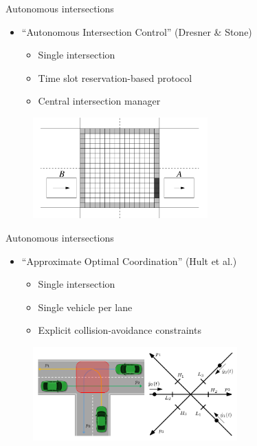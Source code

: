 \documentclass[bigger]{beamer}
\begin{document}
\begin{frame}[label={sec:orgdab9fd7}]{Autonomous intersections}
\begin{itemize}
\item ``Autonomous Intersection Control'' (Dresner \& Stone)
\begin{itemize}
\item Single intersection
\item Time slot reservation-based protocol
\item Central intersection manager
\end{itemize}
\end{itemize}

\begin{figure}
\centering
\includegraphics[width=0.6\textwidth]{figures/dresner_and_stone.png}
\end{figure}
\end{frame}
\begin{frame}[label={sec:orgeee3243}]{Autonomous intersections}
\begin{itemize}
\item ``Approximate Optimal Coordination'' (Hult et al.)
\begin{itemize}
\item Single intersection
\item Single vehicle per lane
\item Explicit collision-avoidance constraints
\end{itemize}
\end{itemize}

\begin{figure}
\centering
\includegraphics[width=0.7\textwidth]{figures/hult_et_al.png}
\end{figure}
\end{frame}
\end{document}
